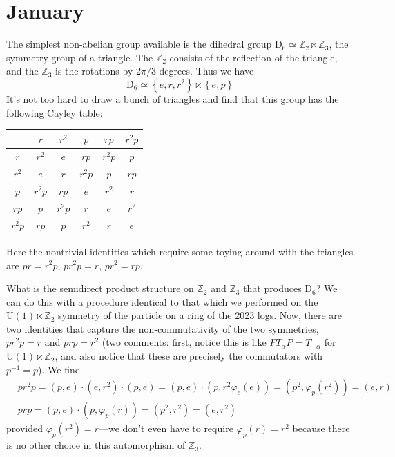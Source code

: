 \documentclass{report}
\begin{document}
\dominitoc 
\tableofcontents

\chapter{January}
\begin{tocbox}
	\minitoc
\end{tocbox}

The simplest non-abelian group available is the dihedral group $ \text{D}_6
\simeq \mathbb{Z}_2 \ltimes \mathbb{Z}_3 $, the symmetry group of a triangle.
The $ \mathbb{Z}_2 $ consists of the reflection of the triangle, and the 
$ \mathbb{Z}_3 $ is the rotations by $ 2\pi / 3 $ degrees. Thus we have 
\begin{equation*}
	\text{D}_6 \simeq \left\{ e, r, r^2 \right\} \ltimes \left\{ e, p \right\}
\end{equation*}
It's not too hard to draw a bunch of triangles and find that this group has the 
following Cayley table:

\begin{table}[h]
\centering
\begin{tabular}{c | c c c c c}
		     & $ r $    & $ r^2 $  & $ p $    & $ rp $   & $ r^2 p $ \\ \hline
	$ r $    & $ r^2 $  & $ e $    & $ rp $   & $ r^2p $ & $ p $     \\
	$ r^2 $  & $ e $    & $ r $    & $ r^2p $ & $ p $    & $ rp $    \\ 
	$ p $    & $ r^2p $ & $ rp $   & $ e $    & $ r^2 $  & $ r $     \\ 
	$ rp $   & $ p $    & $ r^2p $ & $ r $    & $ e $    & $ r^2 $   \\
	$ r^2p $ & $ rp $   & $ p $    & $ r^2 $  &  $ r $   & $ e $
\end{tabular}
\end{table}

Here the nontrivial identities which require some toying around with the 
triangles are $ pr = r^2 p $, $ pr^2 p = r $, $ pr^2 = rp $.

 What is the semidirect product structure on $
\mathbb{Z}_2 $ and $ \mathbb{Z}_3 $ that produces $ \text{D}_6 $?
We can do this with a procedure identical to that which we performed on the 
$ \text{U}(1)\ltimes \mathbb{Z}_2 $ symmetry of the particle on a ring of the
2023 logs. Now, there are two identities that capture the non-commutativity 
of the two symmetries, $ pr^2p = r $ and $ prp  = r^2 $ (two comments: first, 
notice this is like $ PT_{\alpha} P = T_{-\alpha} $ for $ \text{U}(1)\ltimes
\mathbb{Z}_2 $, and also notice that these are precisely the commutators with 
$ p^{-1} = p $). We find 
\begin{align*}
	&pr^2 p = (p,e) \cdot (e, r^2)\cdot(p, e)
		= (p, e)\cdot(p, r^2 \varphi_e(e))
		= (p^2, \varphi_p(r^2))
		= (e, r)\\ 
	&prp = (p, e) \cdot (p, \varphi_p(r)) = (p^2, r^2) = (e, r^2)
\end{align*}
provided $ \varphi_p(r^2) = r $---we don't even have to require $ \varphi_p(r) = r^2 $ because there is no other choice in this automorphism of $ \mathbb{Z}_3 $.
\end{document}
